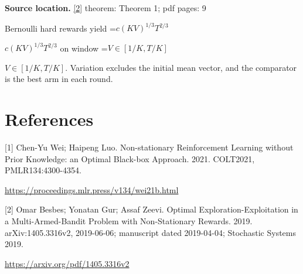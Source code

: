 \documentclass[10pt,a4paper]{article}
\newcommand{\AtlasMath}[1]{\par\begingroup\centering\setbox0=\hbox{$\displaystyle #1$}\ifdim\wd0>1.4\linewidth\typeout{ATLAS WIDE FORMULA: \the\wd0}\fi\ifdim\wd0>\linewidth\resizebox{\linewidth}{!}{\box0}\else\box0\fi\par\endgroup}
\newcommand{\AtlasInlineMath}[1]{\begingroup\setbox0=\hbox{$#1$}\ifdim\wd0>.4\linewidth\endgroup\AtlasMath{#1}\else\endgroup$#1$\fi}
\begin{document}
\textbf{Source location.} \href{https://arxiv.org/pdf/1405.3316v2}{[2]} theorem: Theorem 1; pdf pages: 9

Bernoulli hard rewards yield \AtlasInlineMath{c(KV)^{1/3}T^{2/3}} on window \AtlasInlineMath{V\in[1/K,T/K]}. Variation excludes the initial mean vector, and the comparator is the best arm in each round.

\section{References}
[1] Chen-Yu Wei; Haipeng Luo. Non-stationary Reinforcement Learning without Prior Knowledge: an Optimal Black-box Approach. 2021. COLT2021, PMLR134:4300-4354.

\url{https://proceedings.mlr.press/v134/wei21b.html}

[2] Omar Besbes; Yonatan Gur; Assaf Zeevi. Optimal Exploration-Exploitation in a Multi-Armed-Bandit Problem with Non-Stationary Rewards. 2019. arXiv:1405.3316v2, 2019-06-06; manuscript dated 2019-04-04; Stochastic Systems 2019.

\url{https://arxiv.org/pdf/1405.3316v2}
\end{document}
